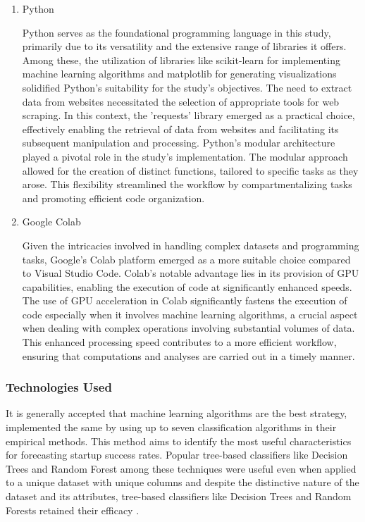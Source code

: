 \documentclass[12pt]{article}
\begin{document}
\begin{enumerate}
    \item Python

Python serves as the foundational programming language in this study, primarily due to its versatility and the extensive range of libraries it offers. Among these, the utilization of libraries like scikit-learn for implementing machine learning algorithms and matplotlib for generating visualizations solidified Python's suitability for the study's objectives. The need to extract data from websites necessitated the selection of appropriate tools for web scraping. In this context, the 'requests' library emerged as a practical choice, effectively enabling the retrieval of data from websites and facilitating its subsequent manipulation and processing. Python's modular architecture played a pivotal role in the study's implementation. The modular approach allowed for the creation of distinct functions, tailored to specific tasks as they arose. This flexibility streamlined the workflow by compartmentalizing tasks and promoting efficient code organization.

\item Google Colab

Given the intricacies involved in handling complex datasets and programming tasks, Google's Colab platform emerged as a more suitable choice compared to Visual Studio Code. Colab's notable advantage lies in its provision of GPU capabilities, enabling the execution of code at significantly enhanced speeds.
The use of GPU acceleration in Colab significantly fastens the execution of code especially when it involves machine learning algorithms, a crucial aspect when dealing with complex operations involving substantial volumes of data. This enhanced processing speed contributes to a more efficient workflow, ensuring that computations and analyses are carried out in a timely manner.

\end{enumerate}

\subsubsection{Technologies Used}
It is generally accepted that machine learning algorithms are the best strategy, \citep{pasayat2022determination} implemented the same by using up to seven classification algorithms in their empirical methods. This method aims to identify the most useful characteristics for forecasting startup success rates. Popular tree-based classifiers like Decision Trees and Random Forest among these techniques were useful even when applied to a unique dataset with unique columns and despite the distinctive nature of the dataset and its attributes, tree-based classifiers like Decision Trees and Random Forests retained their efficacy \citep{pasayat2022determination}.
\end{document}
